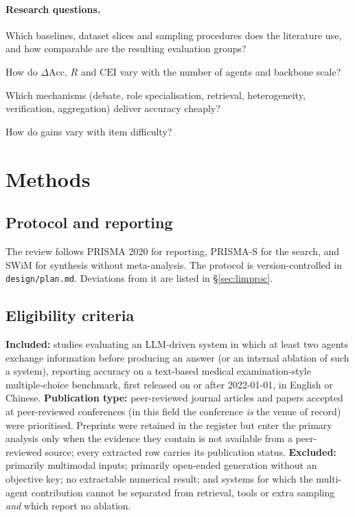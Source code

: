 \documentclass[11pt,a4paper]{article}
\begin{document}
\paragraph{Research questions.}
\begin{description}[leftmargin=2.2em,itemsep=1pt]
\item[RQ1] Which baselines, dataset slices and sampling procedures does the literature use,
and how comparable are the resulting evaluation groups?
\item[RQ2] How do $\Delta\mathrm{Acc}$, $R$ and $\mathrm{CEI}$ vary with the number of agents
and backbone scale?
\item[RQ3] Which mechanisms (debate, role specialisation, retrieval, heterogeneity,
verification, aggregation) deliver accuracy cheaply?
\item[RQ4] How do gains vary with item difficulty?
\end{description}

\section{Methods}

\subsection{Protocol and reporting}
The review follows PRISMA 2020 for reporting, PRISMA-S for the search, and SWiM for
synthesis without meta-analysis. The protocol is version-controlled in
\texttt{design/plan.md}. Deviations from it are listed in \S\ref{sec:limproc}.

\subsection{Eligibility criteria}
\textbf{Included:} studies evaluating an LLM-driven system in which at least two agents
exchange information before producing an answer (or an internal ablation of such a system),
reporting accuracy on a text-based medical examination-style multiple-choice benchmark,
first released on or after 2022-01-01, in English or Chinese.
\textbf{Publication type:} peer-reviewed journal articles and papers accepted at
peer-reviewed conferences (in this field the conference \emph{is} the venue of record) were
prioritised. Preprints were retained in the register but enter the primary analysis only when
the evidence they contain is not available from a peer-reviewed source; every extracted row
carries its publication status.
\textbf{Excluded:} primarily multimodal inputs; primarily open-ended generation without an
objective key; no extractable numerical result; and systems for which the multi-agent
contribution cannot be separated from retrieval, tools or extra sampling \emph{and} which
report no ablation.
\end{document}
